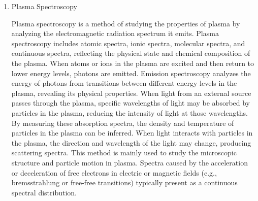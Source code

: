 \begin{enumerate}
\begin{itemize}
\begin{enumerate}
			Plasma Frequency (\( \omega_p \)): Plasma frequency is the frequency at which electrons in the plasma oscillate collectively. It depends on electron density and is defined as:
			
			\[
			\omega_p = \sqrt{\frac{n_e e^2}{\epsilon_0 m_e}}
			\]
			
			where \( n_e \) is the electron density, \( e \) is the electron charge, \( m_e \) is the electron mass, and \( \epsilon_0 \) is the vacuum permittivity.
			
			Debye Length (\( \lambda_D \)): Debye length is the spatial scale over which potential changes significantly in the plasma, defined as:
			
			\[
			\lambda_D = \sqrt{\frac{\epsilon_0 k_B T_e}{n_e e^2}}
			\]
			
			where \( k_B \) is the Boltzmann constant, and \( T_e \) is the electron temperature. The Debye length reflects the plasma's ability to shield external electric fields.
			
			Magnetic Field (\( B \)): In magnetized plasma, the interaction between an external magnetic field and the plasma significantly influences its behavior. For example, in fusion reactors, magnetic fields are used to confine plasma to achieve stable fusion reactions.
			
			\item Plasma Spectroscopy
			
			Plasma spectroscopy is a method of studying the properties of plasma by analyzing the electromagnetic radiation spectrum it emits. Plasma spectroscopy includes atomic spectra, ionic spectra, molecular spectra, and continuous spectra, reflecting the physical state and chemical composition of the plasma. When atoms or ions in the plasma are excited and then return to lower energy levels, photons are emitted. Emission spectroscopy analyzes the energy of photons from transitions between different energy levels in the plasma, revealing its physical properties. When light from an external source passes through the plasma, specific wavelengths of light may be absorbed by particles in the plasma, reducing the intensity of light at those wavelengths. By measuring these absorption spectra, the density and temperature of particles in the plasma can be inferred. When light interacts with particles in the plasma, the direction and wavelength of the light may change, producing scattering spectra. This method is mainly used to study the microscopic structure and particle motion in plasma. Spectra caused by the acceleration or deceleration of free electrons in electric or magnetic fields (e.g., bremsstrahlung or free-free transitions) typically present as a continuous spectral distribution.
			

\end{enumerate}
\end{itemize}
\end{enumerate}
